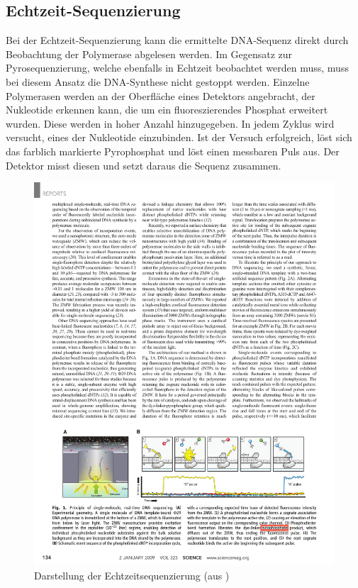 \subsection{Echtzeit-Sequenzierung}
\label{sec:bio:seq:realtime}

Bei der Echtzeit-Sequenzierung kann die ermittelte DNA-Sequenz direkt durch Beobachtung der Polymerase abgelesen werden. Im Gegensatz zur Pyrosequenzierung, welche ebenfalls in Echtzeit beobachtet werden muss, muss bei diesem Ansatz die DNA-Synthese nicht gestoppt werden. Einzelne Polymerasen werden an der Oberfläche eines Detektors angebracht, der Nukleotide erkennen kann, die um ein fluoreszierendes Phosphat erweitert wurden\citep{Eid2009}. Diese werden in hoher Anzahl hinzugegeben. In jedem Zyklus wird versucht, eines der Nukleotide einzubinden. Ist der Versuch erfolgreich, löst sich das farblich markierte Pyrophosphat und löst einen messbaren Puls aus. Der Detektor misst diesen und setzt daraus die Sequenz zusammen.
\begin{figure}[H]
	\begin{center}
		\includegraphics[width=\textwidth]{bilder/Sequenzierung_Realtime}
	\end{center}
	\caption{Darstellung der Echtzeitsequenzierung (aus \citet{Eid2009})}
	\label{fig:bio:seq:realtime}
\end{figure}
